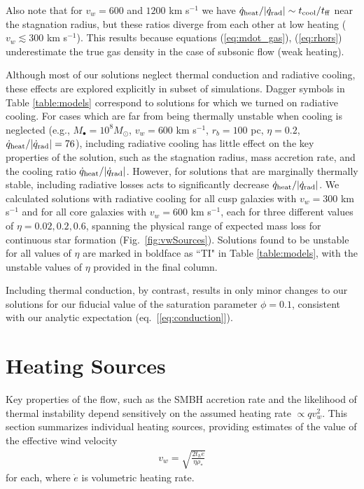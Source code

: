 \documentclass[usenatbib,fleqn]{mn2e}
\newcommand{\rhostar}{\rho_*}
\begin{document}
Also note that for $v_{w}=600$ and $1200$ km s$^{-1}$ we have
$\dot{q}_{\rm heat}/|\dot{q}_{\rm rad}| \sim t_{\rm cool}/t_{\rm ff}$
near the stagnation radius, but these ratios diverge from each other
at low heating ($v_{w} \lesssim 300$ km s$^{-1}$).  This results
because equations (\ref{eq:mdot_gas}), (\ref{eq:rhors}) underestimate
the true gas density in the case of subsonic flow (weak heating).

Although most of our solutions neglect thermal conduction and
radiative cooling, these effects are explored explicitly in subset of
simulations.  Dagger symbols in Table \ref{table:models} correspond to
solutions for which we turned on radiative cooling.  For cases which
are far from being thermally unstable when cooling is neglected (e.g.,
$M_{\bullet} = 10^{8}M_{\odot}$, $v_{w} = 600$ km s$^{-1}$, $r_{b} =
100$ pc, $\eta = 0.2$, $\dot{q}_{\rm heat}/|\dot{q}_{\rm rad}| = 76$),
including radiative cooling has little effect on the key properties of
the solution, such as the stagnation radius, mass accretion rate, and
the cooling ratio $\dot{q}_{\rm heat}/|\dot{q}_{\rm rad}|$.  However,
for solutions that are marginally thermally stable, including
radiative losses acts to significantly decrease $\dot{q}_{\rm
  heat}/|\dot{q}_{\rm rad}|$.  We calculated solutions with radiative
cooling for all cusp galaxies with $v_w=300$ km s$^{-1}$ and for all
core galaxies with $v_w=600 $ km s$^{-1}$, each for three different
values of $\eta = 0.02, 0.2, 0.6$, spanning the physical range of
expected mass loss for continuous star formation
(Fig.~\ref{fig:vwSources}).  Solutions found to be unstable for all
values of $\eta$ are marked in boldface as ``TI" in Table
\ref{table:models}, with the unstable values of $\eta$ provided in the
final column.

Including thermal conduction, by contrast, results in only minor
changes to our solutions for our fiducial value of the saturation
parameter $\phi = 0.1$, consistent with our analytic expectation
(eq.~[\ref{eq:conduction}]).

\section{Heating Sources}
\label{sec:heating}

Key properties of the flow, such as the SMBH accretion rate and the
likelihood of thermal instability depend sensitively on the assumed
heating rate $\propto qv_{w}^{2}$.  This section summarizes individual
heating sources, providing estimates of the value of the effective
wind velocity
\begin{align}
  v_{w} = \sqrt{\frac{2 t_h \dot{e}}{\eta \rhostar}}
  \label{eq:vw_eff}
\end{align}
for each, where $\dot{e}$ is volumetric heating rate.  
\end{document}
